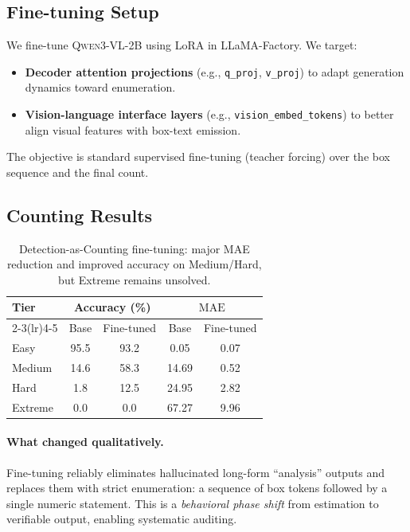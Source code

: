 \documentclass[10pt]{article}
\newcommand{\qwenbase}{\textsc{Qwen3-VL-2B}\xspace}
\newcommand{\mae}{\ensuremath{\mathrm{MAE}}\xspace}
\begin{document}
\subsection{Fine-tuning Setup}
We fine-tune \qwenbase using LoRA in LLaMA-Factory.
We target:
\begin{itemize}[leftmargin=1.2em]
  \item \textbf{Decoder attention projections} (e.g., \texttt{q\_proj}, \texttt{v\_proj}) to adapt generation dynamics toward enumeration.
  \item \textbf{Vision-language interface layers} (e.g., \texttt{vision\_embed\_tokens}) to better align visual features with box-text emission.
\end{itemize}
The objective is standard supervised fine-tuning (teacher forcing) over the box sequence and the final count.

\subsection{Counting Results}
\begin{table}[t]
  \centering
  \small
  \setlength{\tabcolsep}{6pt}
  \begin{tabular}{lcccc}
    \toprule
    \multirow{2}{*}{\textbf{Tier}} & \multicolumn{2}{c}{\textbf{Accuracy (\%)}} & \multicolumn{2}{c}{\textbf{\mae}} \\
    \cmidrule(lr){2-3}\cmidrule(lr){4-5}
     & Base & Fine-tuned & Base & Fine-tuned \\
    \midrule
    Easy     & 95.5 & 93.2 & 0.05 & 0.07 \\
    Medium   & 14.6 & 58.3 & 14.69 & 0.52 \\
    Hard     & 1.8  & 12.5 & 24.95 & 2.82 \\
    Extreme  & 0.0  & 0.0  & 67.27 & 9.96 \\
    \bottomrule
  \end{tabular}
  \caption{Detection-as-Counting fine-tuning: major MAE reduction and improved accuracy on Medium/Hard, but Extreme remains unsolved.}
  \label{tab:finetune_count}
\end{table}

\paragraph{What changed qualitatively.}
Fine-tuning reliably eliminates hallucinated long-form ``analysis'' outputs and replaces them with strict enumeration:
a sequence of box tokens followed by a single numeric statement.
This is a \emph{behavioral phase shift} from estimation to verifiable output, enabling systematic auditing.
\end{document}

